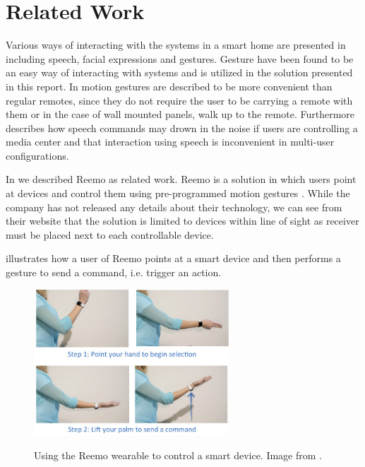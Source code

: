 \section{Related Work}
\label{sec:related-work}

Various ways of interacting with the systems in a smart home are presented in \cite[pp. 9-10]{cook2007smart} including speech, facial expressions and gestures. Gesture have been found to be an easy way of interacting with systems \cite[p. 6]{rahman2011motion} and is utilized in the solution presented in this report. In \cite[pp. 2-3]{starner2000gesture} motion gestures are described to be more convenient than regular remotes, since they do not require the user to be carrying a remote with them or in the case of wall mounted panels, walk up to the remote. Furthermore \cite{starner2000gesture} describes how speech commands may drown in the noise if users are controlling a media center and that interaction using speech is inconvenient in multi-user configurations.

In \cite[pp. 9-11]{prespecialisation} we described Reemo as related work. Reemo is a solution in which users point at devices and control them using pre-programmed motion gestures \cite{reemo:about}. While the company has not released any details about their technology, we can see from their website that the solution is limited to devices within line of sight as receiver must be placed next to each controllable device.

 illustrates how a user of Reemo points at a smart device and then performs a gesture to send a command, i.e. trigger an action.

\begin{figure}[!hbt]
\centering
\includegraphics[width=0.65\textwidth]{images/reemo}
\label{fig:introduction:gesture-control:reemo}
\caption{Using the Reemo wearable to control a smart device. Image from \cite{prespecialisation}.}
\end{figure}

